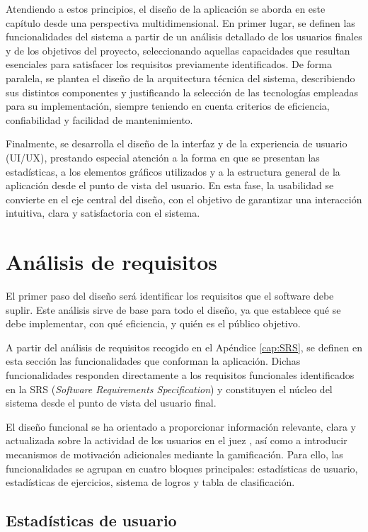 Atendiendo a estos principios, el diseño de la aplicación se aborda en este capítulo desde una perspectiva multidimensional. En primer lugar, se definen las funcionalidades del sistema a partir de un análisis detallado de los usuarios finales y de los objetivos del proyecto, seleccionando aquellas capacidades que resultan esenciales para satisfacer los requisitos previamente identificados. De forma paralela, se plantea el diseño de la arquitectura técnica del sistema, describiendo sus distintos componentes y justificando la selección de las tecnologías empleadas para su implementación, siempre teniendo en cuenta criterios de eficiencia, confiabilidad y facilidad de mantenimiento.

Finalmente, se desarrolla el diseño de la interfaz y de la experiencia de usuario (UI/UX), prestando especial atención a la forma en que se presentan las estadísticas, a los elementos gráficos utilizados y a la estructura general de la aplicación desde el punto de vista del usuario. En esta fase, la usabilidad se convierte en el eje central del diseño, con el objetivo de garantizar una interacción intuitiva, clara y satisfactoria con el sistema.

\section{Análisis de requisitos}

El primer paso del diseño será identificar los requisitos que el software debe suplir. Este análisis sirve de base para todo el diseño, ya que establece qué se debe implementar, con qué eficiencia, y quién es el público objetivo. 

A partir del análisis de requisitos recogido en el Apéndice \ref{cap:SRS}, se definen en esta sección las funcionalidades que conforman la aplicación. Dichas funcionalidades responden directamente a los requisitos funcionales identificados en la SRS (\textit{Software Requirements Specification}) y constituyen el núcleo del sistema desde el punto de vista del usuario final.

El diseño funcional se ha orientado a proporcionar información relevante, clara y actualizada sobre la actividad de los usuarios en el juez \aer, así como a introducir mecanismos de motivación adicionales mediante la gamificación. Para ello, las funcionalidades se agrupan en cuatro bloques principales: estadísticas de usuario, estadísticas de ejercicios, sistema de logros y tabla de clasificación.

\subsection{Estadísticas de usuario}

